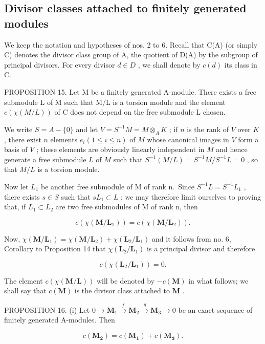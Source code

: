 \subsection{Divisor classes attached to finitely generated modules}

We keep the notation and hypotheses of nos. 2 to 6. Recall that C(A) (or simply C) denotes the divisor class group of A, the quotient of D(A) by the subgroup of principal divisors. For every divisor \(d \in D\) , we shall denote by \(c(d)\) its class in C.

PROPOSITION 15. Let M be a finitely generated A-module. There exists a free submodule L of M such that M/L is a torsion module and the element \(c(\chi(M/L))\) of C does not depend on the free submodule L chosen.

We write \(S = A - \{0\}\) and let \(V = S^{-1}M = M \otimes_{A} K\) ; if \(n\) is the rank of \(V\) over \(K\) , there exist \(n\) elements \(e_i (1 \leqslant i \leqslant n)\) of \(M\) whose canonical images in \(V\) form a basis of \(V\) ; these elements are obviously linearly independent in \(M\) and hence generate a free submodule \(L\) of \(M\) such that \(S^{-1}(M/L) = S^{-1}M/S^{-1}L = 0\) , so that \(M/L\) is a torsion module.

Now let \(L_{1}\) be another free submodule of M of rank n.~Since \(S^{-1}L = S^{-1}L_{1}\) , there exists \(s \in S\) such that \(sL_{1} \subset L\) ; we may therefore limit ourselves to proving that, if \(L_{1} \subset L_{2}\) are two free submodules of M of rank n, then

\[
c (\chi (\mathbf {M} / \mathbf {L} _ {1})) = c (\chi (\mathbf {M} / \mathbf {L} _ {2})).
\]

Now, \(\chi (\mathbf{M} / \mathbf{L}_1) = \chi (\mathbf{M} / \mathbf{L}_2) + \chi (\mathbf{L}_2 / \mathbf{L}_1)\) and it follows from no. 6, Corollary to Proposition 14 that \(\chi (\mathbf{L}_2 / \mathbf{L}_1)\) is a principal divisor and therefore

\[
c (\chi (\mathbf {L} _ {2} / \mathbf {L} _ {1})) = 0.
\]

The element \(c(\chi(\mathbf{M} / \mathbf{L}))\) will be denoted by \(-c(\mathbf{M})\) in what follows; we shall say that \(c(\mathbf{M})\) is the divisor class attached to \(\mathbf{M}\) .

PROPOSITION 16. (i) Let \(0 \to \mathbf{M}_1 \xrightarrow{f} \mathbf{M}_2 \xrightarrow{g} \mathbf{M}_3 \to 0\) be an exact sequence of finitely generated A-modules. Then

\[
c (\mathbf {M _ {2}}) = c (\mathbf {M _ {1}}) + c (\mathbf {M _ {3}}).
\]


